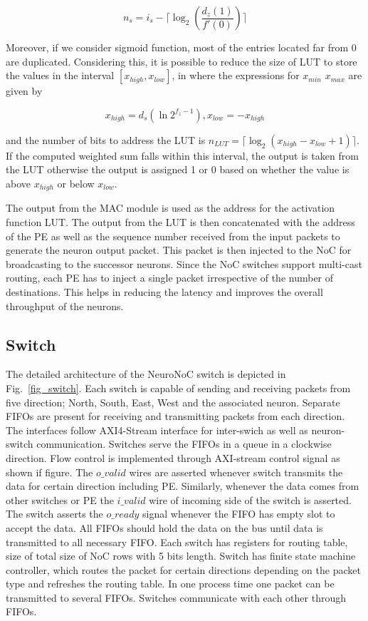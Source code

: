 \begin{equation}
n_{s}=i_{s}-\lceil\log_{2}(\frac{d_{z}(1)}{{f}'(0)})\rceil
\label{equation:ns}
\end{equation}

Moreover, if we consider sigmoid function, most of the entries located far from 0 are duplicated. 
Considering this, it is possible to reduce the size of LUT to store the values in the interval $[x_{high}, x_{low}]$, in where the expressions for $x_{min}$ $x_{max}$ are given by

\begin{equation}
x_{high}=d_{s}(\ln{2^{f_{z}-1}}), x_{low}=-x_{high}
\label{equation:interval}
\end{equation}

and the number of bits to address the LUT is 
$n_{LUT}=\lceil\log_{2}{(x_{high}-x_{low}+1)}\rceil$.
If the computed weighted sum falls within this interval, the output is taken from the LUT otherwise the output is assigned 1 or 0 based on whether the value is above $x_{high}$ or below $x_{low}$. 

The output from the MAC module is used as the address for the activation function LUT.
The output from the LUT is then concatenated with the address of the PE as well as the sequence number received from the input packets to generate the neuron output packet.
This packet is then injected to the NoC for broadcasting to the successor neurons.
Since the NoC switches support multi-cast routing, each PE has to inject a single packet irrespective of the number of destinations.
This helps in reducing the latency and improves the overall throughput of the neurons. 
\subsection{Switch}
The detailed architecture of the NeuroNoC switch is depicted in Fig.~\ref{fig_switch}. 
Each switch is capable of sending and receiving packets from five direction; North, South, East, West and the associated neuron. 
Separate FIFOs are present for receiving and transmitting packets from each direction.
The interfaces follow AXI4-Stream interface for inter-swich as well as neuron-switch communication.
Switches serve the FIFOs in a queue in a clockwise direction.  Flow control is implemented through AXI-stream control signal as shown if figure.  The $o\_valid$ wires are asserted whenever switch transmits the data for certain direction including PE. Similarly, whenever the data comes from other switches or PE the $i\_valid$ wire of incoming side of the switch is asserted. The switch asserts the $o\_ready$ signal whenever the FIFO has empty slot to accept the data. All FIFOs should hold the data on the bus until data is transmitted to all necessary FIFO. Each switch has registers for routing table, size of total size of NoC rows with 5 bits length. Switch has finite state machine controller, which routes the packet for certain directions depending on the packet type and refreshes the routing table. In one process time one packet can be transmitted to several FIFOs. Switches communicate with each other through FIFOs.  


